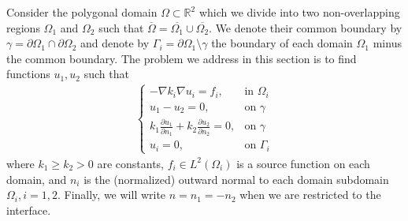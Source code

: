 Consider the polygonal domain \(\Omega \subset \mathbb{R}^2\) which we divide into two non-overlapping regions \(\Omega_1\) and \(\Omega_2\) such that \(\overline{\Omega} = \overline{\Omega_1} \cup \overline{\Omega_2}\). We denote their common boundary by \(\gamma = \partial\Omega_1 \cap \partial\Omega_2\) and denote by \(\Gamma_i = \partial\Omega_1\setminus{\gamma}\) the boundary of each domain \(\Omega_1\) minus the common boundary. The problem we address in this section is to find functions \(u_1, u_2\) such that
\begin{align}\label{decomp_prob}
    \begin{cases}
    - \nabla k_i \nabla u_i = f_i, & \text{in }\Omega_i\\
    u_1 - u_2 = 0, & \text{on }\gamma\\
    k_1 \frac{\partial u_1}{\partial n_1} + k_2 \frac{\partial u_2}{\partial n_2} = 0, & \text{on }\gamma\\
    u_i = 0, & \text{on }\Gamma_i
    \end{cases}
\end{align}
where \(k_1 \geq k_2 > 0\) are constants, \(f_i \in L^2(\Omega_i)\) is a source function on each domain, and \(n_i\) is the (normalized) outward normal to each domain subdomain \(\Omega_i, i=1, 2\). Finally, we will write \(n=n_1=-n_2\) when we are restricted to the interface.

